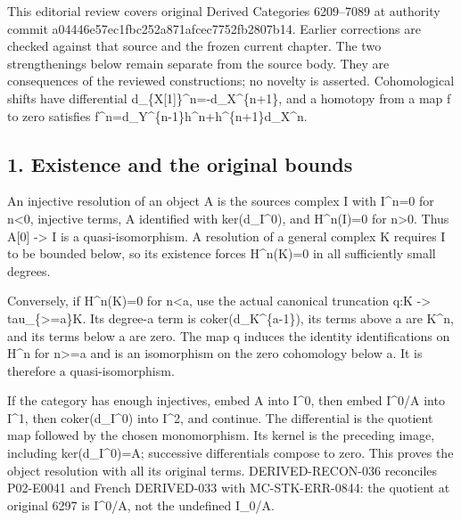 \documentclass[11pt]{article}
\begin{document}
This editorial review covers original Derived Categories 6209–\allowbreak{}7089 at authority commit a04446e5\allowbreak{}7ec1fbc2\allowbreak{}52a871af\allowbreak{}cec7752f\allowbreak{}b2807b14. Earlier corrections are checked against that source and the frozen current chapter. The two strengthenings below remain separate from the source body. They are consequences of the reviewed constructions; no novelty is asserted. Cohomological shifts have differential d\_\allowbreak{}\{X[1]\allowbreak{}\}\textasciicircum{}n\allowbreak{}=-d\_\allowbreak{}X\textasciicircum{}\{n\allowbreak{}+1\},\allowbreak{} and a homotopy from a map f to zero satisfies f\textasciicircum{}n\allowbreak{}=d\_\allowbreak{}Y\textasciicircum{}\{n-1\}h\textasciicircum{}n\allowbreak{}+h\textasciicircum{}\{n\allowbreak{}+1\}d\_\allowbreak{}X\textasciicircum{}n.

\subsection{1. Existence and the original bounds}\label{proofs-6209-7089-existence-and-the-original-bounds}

An injective resolution of an object A is the source\textquotesingle s complex I with I\textasciicircum{}n\allowbreak{}=0 for n<0,\allowbreak{} injective terms,\allowbreak{} A identified with ker(d\_\allowbreak{}I\textasciicircum{}0)\allowbreak{},\allowbreak{} and H\textasciicircum{}n(I)\allowbreak{}\allowbreak{}=0 for n\textgreater0. Thus A[0]\allowbreak{} \allowbreak{}-> I is a quasi-isomorphism. A resolution of a general complex K requires I to be bounded below,\allowbreak{} so its existence forces H\textasciicircum{}n(K)\allowbreak{}\allowbreak{}=0 in all sufficiently small degrees.

Conversely,\allowbreak{} if H\textasciicircum{}n(K)\allowbreak{}\allowbreak{}=0 for n<a,\allowbreak{} use the actual canonical truncation q:\allowbreak{}K \allowbreak{}-> tau\_\allowbreak{}\{>\allowbreak{}=a\}K. Its degree-a term is coker(d\_\allowbreak{}K\textasciicircum{}\{a-1\})\allowbreak{},\allowbreak{} its terms above a are K\textasciicircum{}n,\allowbreak{} and its terms below a are zero. The map q induces the identity identifications on H\^{}n for n>\allowbreak{}=a and is an isomorphism on the zero cohomology below a. It is therefore a quasi-isomorphism.

If the category has enough injectives,\allowbreak{} embed A into I\textasciicircum{}0,\allowbreak{} then embed I\textasciicircum{}0/\allowbreak{}A into I\textasciicircum{}1,\allowbreak{} then coker(d\_\allowbreak{}I\textasciicircum{}0)\allowbreak{} into I\textasciicircum{}2,\allowbreak{} and continue. The differential is the quotient map followed by the chosen monomorphism. Its kernel is the preceding image,\allowbreak{} including ker(d\_\allowbreak{}I\textasciicircum{}0)\allowbreak{}\allowbreak{}=A; successive differentials compose to zero. This proves the object resolution with all its original terms. DERIVED-RECON-036 reconciles P02-E0041 and French DERIVED-033 with MC-STK-ERR-0844:\allowbreak{} the quotient at original 6297 is I\textasciicircum{}0/\allowbreak{}A,\allowbreak{} not the undefined I\_\allowbreak{}0/\allowbreak{}A.
\end{document}
